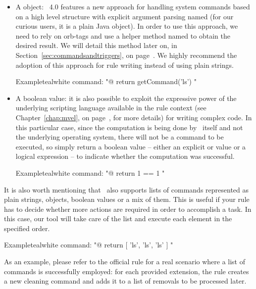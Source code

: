 \begin{description}
\begin{description}
\begin{itemize}[label={--}]
\item A  object: \arara\ 4.0 features a new approach for handling system commands based on a high level structure with explicit argument parsing named  (for our curious users, it is a plain Java object). In order to use this approach, we need to rely on \glspl{orb-tag} and use a helper method named  to obtain the desired result. We will detail this method later on, in Section~\ref{sec:commandsandtriggers}, on page~\pageref{sec:commandsandtriggers}. We highly recommend the adoption of this approach for rule writing instead of using plain strings.

\begin{codebox}{Example}{teal}{\icnote}{white}
command: "@{ return getCommand('ls') }"
\end{codebox}

\item A boolean value: it is also possible to exploit the expressive power of the underlying scripting language available in the rule context (see Chapter~\ref{chap:mvel}, on page~\pageref{chap:mvel}, for more details) for writing complex code. In this particular case, since the computation is being done by \arara\ itself and not the underlying operating system, there will not be a command to be executed, so simply return a boolean value -- either an explicit  or  value or a logical expression -- to indicate whether the computation was successful.

\begin{codebox}{Example}{teal}{\icnote}{white}
command: "@{ return 1 == 1 }"
\end{codebox}
\end{itemize}

It is also worth mentioning that \arara\ also supports lists of commands represented as plain strings,  objects, boolean values or a mix of them. This is useful if your rule has to decide whether more actions are required in order to accomplish a task. In this case, our tool will take care of the list and execute each element in the specified order.

\begin{codebox}{Example}{teal}{\icnote}{white}
command: "@{ return [ 'ls', 'ls', 'ls' ] }"
\end{codebox}

As an example, please refer to the official  rule for a real scenario where a list of commands is successfully employed: for each provided extension, the rule creates a new cleaning command and adds it to a list of removals to be processed later.


\end{description}
\end{description}
